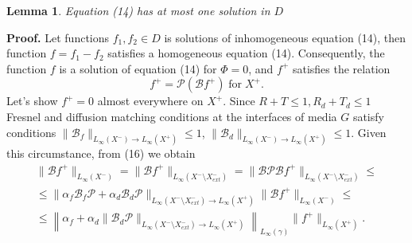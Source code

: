\documentclass[12pt,reqno]{report}
\newtheorem{lemma}{Lemma}
\begin{document}
\begin{lemma}
Equation (14) has at most one solution in $D$ 
\end{lemma}
{\bf Proof.}
Let functions $f_1,f_2\in D$ is solutions of inhomogeneous equation (14), then function $f=f_1-f_2$ satisfies a homogeneous equation (14). Consequently, the function $f$ is a solution of equation (14) for $\Phi = 0$, and $f^+$ satisfies the relation
\begin{equation}
f^+= \mathcal P (\mathcal B f^+)\; \text{for} \; X^+.
\end{equation}
Let's show $f^+=0$ almost everywhere on $X^+$.
Since $R+T \leq 1, R_d+T_d \leq 1$ Fresnel and diffusion matching conditions at the interfaces of media $G$ satisfy conditions  
$\|\mathcal B_f \|_{L_{\infty}(X^-)\to L_{\infty}(X^+)}\leq 1 $, $\|\mathcal B_d \|_{L_{\infty}(X^-)\to L_{\infty}(X^+)} \leq 1$. 
Given this circumstance, from (16) we obtain
\begin{multline}
\|\mathcal B f^+\|_{L_{\infty}(X^-)} = \|\mathcal B f^+\|_{L_{\infty}(X^-\setminus X^-_{ext})} = \| \mathcal B \mathcal P \mathcal B  f^+\|_{L_{\infty}(X^-\setminus X^-_{ext})} \leq \\ \leq  \| \alpha_f \mathcal B_f \mathcal P   +\alpha_d \mathcal B_d \mathcal P\|_{L_{\infty}(X^-\setminus X^-_{ext})\to L_{\infty}(X^+)} \|  \mathcal B f^+\|_{L_{\infty}(X^-)} \leq \\ \leq \left \| \alpha_f  +\alpha_d \|\mathcal B_d  \mathcal P \|_{L_{\infty}(X^-\setminus X^-_{ext})\to L_{\infty}(X^+)} \right\|_{L_{\infty}(\gamma)} \|   f^+\|_{L_{\infty}(X^+)}.
\end{multline}
\end{document}
